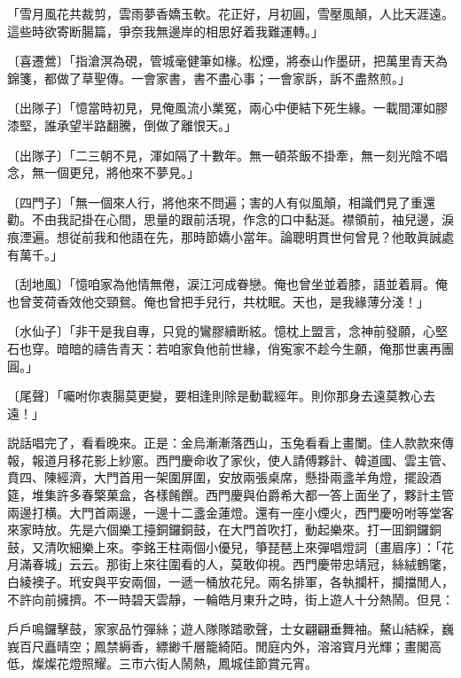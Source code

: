 \begin{myquote}
「雪月風花共裁剪，雲雨夢香嬌玉軟。花正好，月初圓，雪壓風顛，人比天涯遠。這些時欲寄断腸篇，爭奈我無邊岸的相思好着我難運轉。」

{\markfont〔喜遷鶯〕}「指滄溟為硯，管城毫健筆如椽。松煙，將泰山作墨研，把萬里青天為錦箋，都做了草聖傳。一會家書，書不盡心事；一會家訴，訴不盡熬煎。」

{\markfont〔出隊子〕}「憶當時初見，見俺風流小業冤，兩心中便結下死生緣。一載間渾如膠漆堅，誰承望半路翻騰，倒做了離恨天。」

{\markfont〔出隊子〕}「二三朝不見，渾如隔了十數年。無一頓茶飯不掛牽，無一刻光陰不唱念，無一個更兒，將他來不夢見。」

{\markfont〔四門子〕}「無一個來人行，將他來不問遍；害的人有似風顛，相識們見了重還勸。不由我記掛在心間，思量的跟前活現，作念的口中黏涎。襟領前，袖兒邊，淚痕湮遍。想従前我和他語在先，那時節嬌小當年。論聰明貫世何曾見？他敢眞誠處有萬千。」

{\markfont〔刮地風〕}「憶咱家為他情無倦，涙江河成眷戀。俺也曾坐並着膝，語並着肩。俺也曾芰荷香效他交頸鴛。俺也曾把手兒行，共枕眠。天也，是我緣薄分淺！」

{\markfont〔水仙子〕}「非干是我自專，只覓的鸞膠續断絃。憶枕上盟言，念神前發願，心堅石也穿。暗暗的禱告青天：若咱家負他前世緣，俏寃家不趁今生願，俺那世裏再團圓。」

{\markfont〔尾聲〕}「囑咐你衷腸莫更變，要相逢則除是動載經年。則你那身去遠莫教心去遠！」
\end{myquote}

説話唱完了，看看晚來。正是：金烏漸漸落西山，玉兔看看上畫闌。佳人款款來傳報，報道月移花影上紗窻。西門慶命收了家伙，使人請傅夥計、韓道國、雲主管、賁四、陳經濟，大門首用一架圍屏圍，安放兩張桌席，懸掛兩盞羊角燈，擺設酒筵，堆集許多春檠菓盒，各樣餚饌。西門慶與伯爵希大都一答上面坐了，夥計主管兩邊打横。大門首兩邊，一邊十二盞金蓮燈。還有一座小煙火，西門慶吩咐等堂客來家時放。先是六個樂工擡銅鑼銅鼓，在大門首吹打，動起樂來。打一囬銅鑼銅鼓，又清吹細樂上來。李銘王柱兩個小優兒，箏琵琶上來彈唱燈詞〔畫眉序〕：「花月滿春城」云云。那街上來往圍看的人，莫敢仰視。西門慶带忠靖冠，絲絨鶴氅，白綾襖子。玳安與平安兩個，一遞一桶放花兒。兩名排軍，各執攔杆，攔擋閒人，不許向前擁擠。不一時碧天雲靜，一輪皓月東升之時，街上遊人十分熱鬧。但見：

\begin{myquote}
戶戶鳴鑼擊鼓，家家品竹彈絲；遊人隊隊踏歌聲，士女翩翩垂舞袖。鰲山結綵，巍峩百尺矗晴空；鳳禁縟香，縹緲千層籠綺陌。閒庭内外，溶溶寳月光輝；畫閣高低，燦燦花燈照耀。三市六街人鬧熱，鳳城佳節賞元宵。
\end{myquote}


